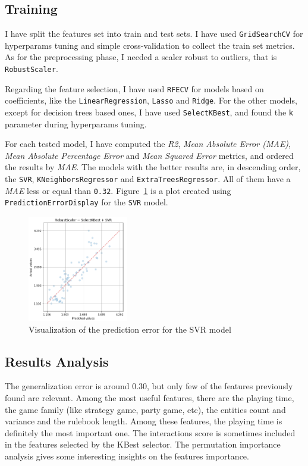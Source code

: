 \documentclass[runningheads]{llncs}
\begin{document}
\subsection{Training}
I have split the features set into train and test sets. I have used \verb|GridSearchCV| for hyperparams tuning and simple cross-validation to collect the train set metrics. As for the preprocessing phase, I needed a scaler robust to outliers, that is \verb|RobustScaler|. 

Regarding the feature selection, I have used \verb|RFECV| for models based on coefficients, like the \verb|LinearRegression|, \verb|Lasso| and \verb|Ridge|. For the other models, except for decision trees based ones, I have used \verb|SelectKBest|, and found the \verb|k| parameter during hyperparams tuning.

For each tested model, I have computed the \textit{R2}, \textit{Mean Absolute Error (MAE)}, \textit{Mean Absolute Percentage Error} and \textit{Mean Squared Error} metrics, and ordered the results by \textit{MAE}. The models with the better results are, in descending order, the \verb|SVR|, \verb|KNeighborsRegressor| and \verb|ExtraTreesRegressor|. All of them have a \textit{MAE} less or equal than \verb|0.32|. Figure~\ref{fig1} is a plot created using \verb|PredictionErrorDisplay| for the \verb|SVR| model.

\begin{figure}
    \centering
    \includegraphics[width=0.39\textwidth]{images/SVR_Predictions.png}
    \caption{Visualization of the prediction error for the SVR model} \label{fig1}
\end{figure}

\clearpage

\subsection{Results Analysis}
The generalization error is around 0.30, but only few of the features previously found are relevant. Among the most useful features, there are the playing time, the game family (like strategy game, party game, etc), the entities count and variance and the rulebook length. Among these features, the playing time is definitely the most important one. The interactions score is sometimes included in the features selected by the KBest selector. The permutation importance analysis gives some interesting insights on the features importance. 
\end{document}
